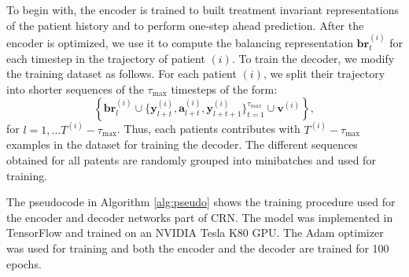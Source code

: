 \documentclass{article} %
\newcommand{\vc}[1]{\mathbf{#1}}
\begin{document}
	To begin with, the encoder is trained to built treatment invariant representations of the patient history and to perform one-step ahead prediction. After the encoder is optimized, we use it to compute the balancing representation $\vc{br}^{(i)}_t$ for each timestep in the trajectory of patient $(i)$. To train the decoder, we modify the training dataset as follows. For each patient $(i)$, we split their trajectory into shorter sequences of the $\tau_{\max}$ timesteps of the form: 
	\begin{equation}\left\{\mathbf{br}_l^{(i)} \cup \{\vc{y}^{(i)}_{l + t},  \vc{a}^{(i)}_{l + t}, \vc{y}_{l + t+1}^{(i)} \}_{t=1}^{\tau_{max}} \cup \vc{v}^{(i)}   \right\},
	\end{equation}
	for $l=1, \dots T^{(i)} - \tau_{\max}$. Thus, each patients contributes with $T^{(i)} - \tau_{\max}$ examples in the dataset for training the decoder. The different sequences obtained for all patents are randomly grouped into minibatches and used for training.  
	
	The pseudocode in Algorithm \ref{alg:pseudo} shows the training procedure used for the encoder and decoder networks part of CRN. The model was implemented in TensorFlow and trained on an NVIDIA Tesla K80 GPU. The Adam optimizer \citep{kingma2014adam} was used for training and both the encoder and the decoder are trained for 100 epochs. 
	
	\newpage
	
\end{document}
